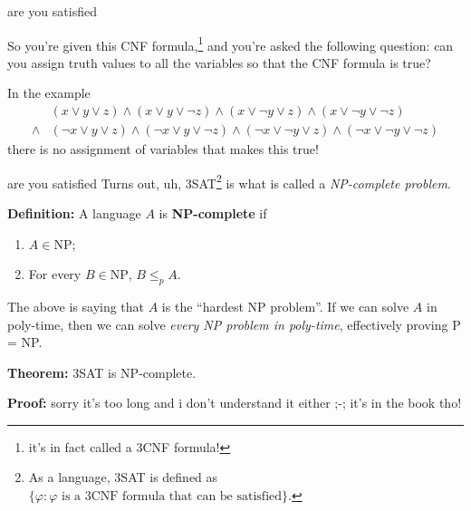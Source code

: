 \documentclass{beamer}
\begin{document}
\begin{frame}{are you satisfied \emojiflushed}

So you're given this CNF formula,\footnote{it's in fact called a 3CNF formula!} and you're asked the following question: can you assign truth values to all the variables so that the CNF formula is true? 

\vspace{2mm}

In the example \begin{align*}
&(x \lor y \lor z) \land (x \lor y \lor \neg z) \land (x \lor \neg y \lor z) \land  (x \lor \neg y \lor \neg z)\\
\land &(\neg x \lor y \lor z) \land (\neg x \lor y \lor \neg z) \land (\neg x \lor \neg y \lor z) \land (\neg x \lor \neg y \lor \neg z)
\end{align*}
there is no assignment of variables that makes this true!
\end{frame}

\begin{frame}{are you satisfied \emojiflushed}
Turns out, uh, 3SAT\footnote{As a language, 3SAT is defined as $\{\varphi: \text{$\varphi$ is a 3CNF formula that can be satisfied}\}$.} is what is called a \textit{NP-complete problem}. 

\textbf{Definition:} A language $A$ is \textbf{NP-complete} if
\begin{enumerate}[label=(\alph*)]
\item $A \in \text{NP}$;
\item For every $B \in \text{NP}$, $B \leq_p A$.
\end{enumerate}
The above is saying that $A$ is the ``hardest NP problem''. If we can solve $A$ in poly-time, then we can solve \textit{every NP problem in poly-time}, effectively proving P = NP.

\vspace{2mm}

\textbf{Theorem:} 3SAT is NP-complete.

\textbf{Proof:} sorry it's too long and i don't understand it either ;-; it's in the book tho!
\end{frame}
\end{document}

